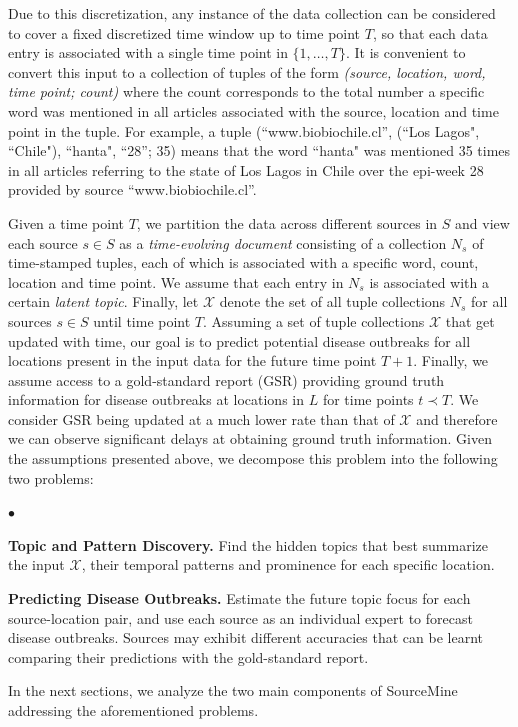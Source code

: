 \documentclass[conference]{IEEEtran}
\newcommand{\squishlist}{
   \begin{list}{$\bullet$}
    {
      \setlength{\itemsep}{0pt}
      \setlength{\parsep}{3pt}
      \setlength{\topsep}{3pt}
      \setlength{\partopsep}{0pt}
      \setlength{\leftmargin}{1.5em}
      \setlength{\labelwidth}{1em}
      \setlength{\labelsep}{0.5em} } }
\newcommand{\squishend}{
    \end{list}  }
\newcommand{\fullmodel}{{{\sf SourceMine}}\xspace}
\begin{document}
Due to this discretization, any instance of the data collection can be considered to cover a fixed discretized time window up to time point $T$, so that each data entry is associated with a single time point in $\{1, \dots,T\}$. It is convenient to convert this input to a collection of tuples of the form {\em (source, location, word, time point; count)} where the count corresponds to the total number a specific word was mentioned in all articles associated with the source, location and time point in the tuple. For example, a tuple (``www.biobiochile.cl'', (``Los Lagos", ``Chile"), ``hanta", ``28''; 35) means that the word ``hanta" was mentioned 35 times in all articles referring to the state of Los Lagos in Chile over the epi-week 28 provided by source ``www.biobiochile.cl''.  

Given a time point $T$, we partition the data across different sources in $S$ and view each source $s \in S$ as a {\em time-evolving document} consisting of a collection $N_s$ of time-stamped tuples, each of which is associated with a specific word, count, location and time point. We assume that each entry in $N_s$ is associated with a certain {\em latent topic}. Finally, let $\mathcal{X}$ denote the set of all tuple collections $N_s$ for all sources $s \in S$ until time point $T$. Assuming a set of tuple collections $\mathcal{X}$ that get updated with time, our goal is to predict potential disease outbreaks for all locations present in the input data for the future time point $T+1$. Finally, we assume access to a gold-standard report (GSR) providing ground truth information for disease outbreaks at locations in $L$ for time points $t \prec T$. We consider GSR being updated at a much lower rate than that of $\mathcal{X}$ and therefore we can observe significant delays at obtaining ground truth information. Given the assumptions presented above, we decompose this problem into the following two problems:
\squishlist
\item {\bf Topic and Pattern Discovery.} Find the hidden topics that best summarize the input $\mathcal{X}$, their temporal patterns and prominence for each specific location.
\item {\bf Predicting Disease Outbreaks.} Estimate the future topic focus for each source-location pair, and use each source as an individual expert to forecast disease outbreaks. Sources may exhibit different accuracies that can be learnt comparing their predictions with the gold-standard report.
\squishend
In the next sections, we analyze the two main components of \fullmodel addressing the aforementioned problems.
\end{document}
